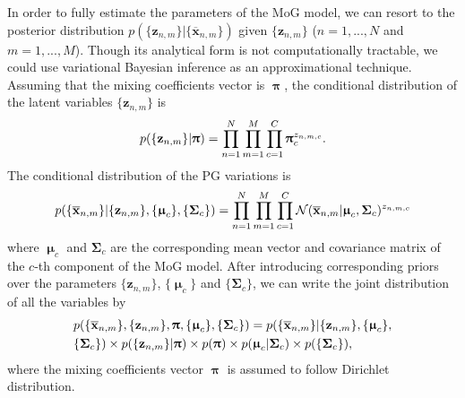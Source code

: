 \documentclass[runningheads]{llncs}
\begin{document}
In order to fully estimate the parameters of the MoG model, we can resort to the posterior distribution $p(\{\mathbf{z}_{n,m}\}|\{\mathbf{\overline{x}}_{n,m}\})$ given $\{\mathbf{z}_{n,m}\}$ ($n=1,...,N$ and $m=1,...,M$). Though its analytical form is not computationally tractable, we could use variational Bayesian inference as an approximational technique. Assuming that the mixing coefficients vector is $\boldsymbol{\uppi}$, the conditional distribution of the latent variables $\{\mathbf{z}_{n,m}\}$ is 
\vspace{-0.05in}
\begin{equation}\label{equ1}
\vspace{-0.1in}
p(\{\mathbf{z}_{n,m}\}|\boldsymbol{\uppi}) = \prod_{n=1}^{N}\prod_{m=1}^{M}\prod_{c=1}^{C}\boldsymbol{\uppi}_{c}^{z_{n,m,c}}.
\end{equation}
The conditional distribution of the PG variations is 
\vspace{-0.1in}
\begin{equation}\label{equ2}
\vspace{-0.1in}
p(\{\mathbf{\overline{x}}_{n,m}\}|\{\mathbf{z}_{n,m}\},\{\boldsymbol{\upmu}_{c}\},\{\mathbf{\Sigma}_{c}\}) = \prod_{n=1}^{N}\prod_{m=1}^{M}\prod_{c=1}^{C}\mathcal{N}(\mathbf{\overline{x}}_{n,m}|\boldsymbol{\upmu}_{c},\mathbf{\Sigma}_{c})^{z_{n,m,c}}
\end{equation}
where $\boldsymbol{\upmu}_{c}$ and $\mathbf{\Sigma}_{c}$ are the corresponding mean vector and covariance matrix of the $c$-th component of the MoG model. After introducing corresponding priors over the parameters $\{\mathbf{z}_{n,m}\}$, $\{\boldsymbol{\upmu}_{c}\}$ and $\{\mathbf{\Sigma}_{c}\}$, we can write the joint distribution of all the variables by 
\vspace{-0.05in}
\begin{equation}\label{equ3}
\vspace{-0.05in}
\begin{split}
&p(\{\mathbf{\overline{x}}_{n,m}\},\{\mathbf{z}_{n,m}\},\boldsymbol{\uppi},\{\boldsymbol{\upmu}_{c}\},\{\mathbf{\Sigma}_{c}\}) 
=
p(\{\mathbf{\overline{x}}_{n,m}\}|\{\mathbf{z}_{n,m}\},\{\boldsymbol{\upmu}_{c}\},
\\
&
\{\mathbf{\Sigma}_{c}\})\times p(\{\mathbf{z}_{n,m}\}|\boldsymbol{\uppi})
\times p(\boldsymbol{\uppi})
\times p(\boldsymbol{\upmu}_{c}|\mathbf{\Sigma}_{c})
\times p(\{\mathbf{\Sigma}_{c}\}),
\end{split}
\end{equation}
where the mixing coefficients vector $\boldsymbol{\uppi}$ is assumed to follow Dirichlet distribution.
\end{document}
